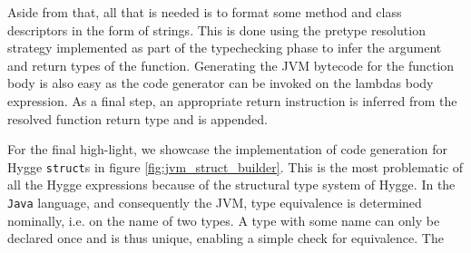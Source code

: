 Aside from that, all that is needed is to format some method and class descriptors in the form of strings. This is done using the pretype resolution strategy
implemented as part of the typechecking phase to infer the argument and return types of the function. Generating the JVM bytecode for the function
body is also easy as the code generator can be invoked on the lambdas body expression. As a final step, an appropriate return instruction is inferred
from the resolved function return type and is appended.

For the final high-light, we showcase the implementation of code generation for Hygge \texttt{struct}s in figure \ref{fig:jvm_struct_builder}.
This is the most problematic of all the Hygge expressions because of the structural type system of Hygge. In the \texttt{Java} language, and consequently the JVM,
type equivalence is determined nominally, i.e. on the name of two types. A type with some name can only be declared once and is thus unique, enabling
a simple check for equivalence. The 

